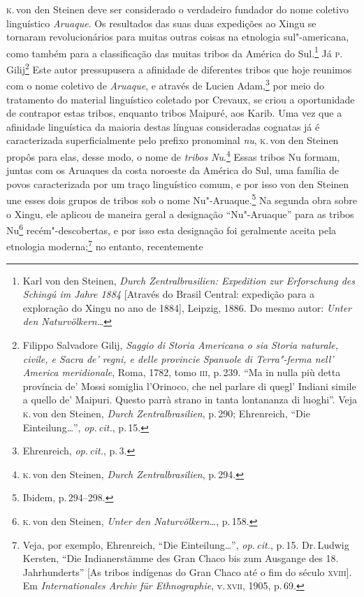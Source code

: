 \textsc{k}.\,von den Steinen deve ser considerado o verdadeiro fundador do nome
coletivo linguístico \textit{Aruaque}. Os resultados das suas duas expedições ao
Xingu se tornaram revolucionários para muitas outras coisas na etnologia
sul"-americana, como também para a classificação das muitas tribos da
América do Sul.\footnote{Karl von den Steinen, \textit{Durch
  Zentralbrasilien: Expedition zur Erforschung des Schingú im Jahre
  1884} {[}Através do Brasil Central: expedição para a exploração do
  Xingu no ano de 1884{]}, Leipzig, 1886. Do mesmo autor: \textit{Unter den Naturvölkern\ldots}} Já \textsc{p}.\,Gilij\footnote{Filippo Salvadore Gilij,
  \textit{Saggio di Storia Americana o sia Storia
  naturale, civile, e Sacra de' regni, e delle provincie Spanuole di
  Terra"-ferma nell' America meridionale}, Roma, 1782, tomo \textsc{iii}, p.\,239.
  ``Ma in nulla più detta província de' Mossi somiglia l'Orinoco, che
  nel parlare di quegl' Indiani simile a quello de' Maipuri. Questo
  parrà strano in tanta lontananza di luoghi''.
  Veja \textsc{k}.\,von den Steinen, \textit{Durch Zentralbrasilien}, p.\,290;
  Ehrenreich, ``Die Einteilung\ldots'', \textit{op.\,cit.}, p.\,15.} Este autor pressupusera a afinidade de diferentes tribos que hoje
reunimos com o nome coletivo de \textit{Aruaque}, e através de Lucien
Adam,\footnote{Ehrenreich, \textit{op.\,cit.}, p.\,3.} por meio do tratamento do
material linguístico coletado por Crevaux, se criou a oportunidade de
contrapor estas tribos, enquanto tribos Maipuré, aos Karib. Uma vez que
a afinidade linguística da maioria destas línguas consideradas cognatas
já é caracterizada superficialmente pelo prefixo pronominal \textit{nu}, \textsc{k.}\,von 
den Steinen propôs para elas, desse modo, o nome de \textit{tribos
Nu}.\footnote{\textsc{k}.\,von den Steinen, \textit{Durch Zentralbrasilien}, p.\,294.}
Essas tribos Nu formam, juntas com os Aruaques da costa noroeste da
América do Sul, uma família de povos caracterizada por um traço
linguístico comum, e por isso von den Steinen une esses dois grupos
de tribos sob o nome Nu"-Aruaque.\footnote{Ibidem, p.\,294--298.} Na
segunda obra sobre o Xingu, ele aplicou de maneira geral a
designação ``Nu"-Aruaque'' para as tribos Nu\footnote{\textsc{k}.\,von den
  Steinen, \textit{Unter den Naturvölkern\ldots}, p.\,158.}
recém"-descobertas, e por isso esta designação foi geralmente
aceita pela etnologia moderna;\footnote{Veja, por exemplo, Ehrenreich,
  ``Die Einteilung\ldots'', \textit{op.\,cit.}, p.\,15. Dr.\,Ludwig Kersten, ``Die Indianerstämme des Gran Chaco
  bis zum Ausgange des 18. Jahrhunderts'' {[}As tribos indígenas do Gran
  Chaco até o fim do século \textsc{xviii}{]}. Em \textit{Internationales Archiv
  für Ethnographie}, v.\,\textsc{xvii}, 1905, p.\,69.} no entanto, recentemente
